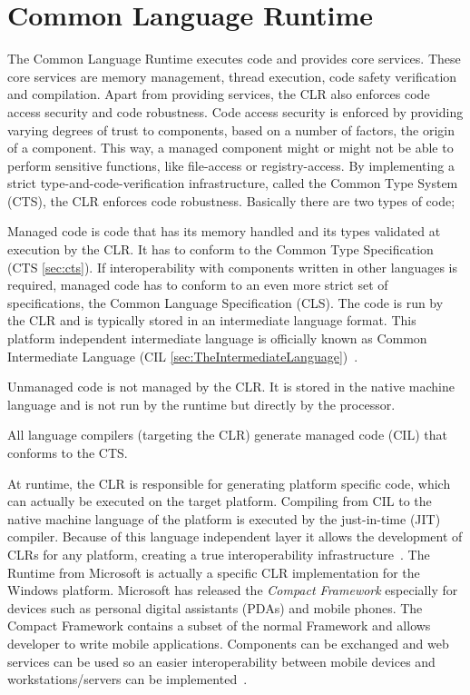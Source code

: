 \section{Common Language Runtime}
\label{sec:clr}
The Common Language Runtime executes code and provides core services. These core services are memory management, thread execution, code safety verification and compilation. Apart from providing services, the CLR also enforces code access security and code robustness. 
Code access security is enforced by providing varying degrees of trust to components, based on a number of factors, \eg the origin of a component. 
This way, a managed component might or might not be able to perform sensitive functions, like file-access or registry-access. 
By implementing a strict type-and-code-verification infrastructure, called the Common Type System (CTS), the CLR enforces code robustness. Basically there are two types of code; 

\begin{description}[noitemsep,style=nextline]
\item[Managed]
Managed code is code that has its memory handled and its types validated at execution by the CLR.
It has to conform to the Common Type Specification (CTS \autoref{sec:cts}).
If interoperability with components written in other languages is required, managed code has to conform to an even more strict set of specifications, the Common Language Specification (CLS).
The code is run by the CLR and is typically stored in an intermediate language format. This platform independent intermediate language is officially known as Common Intermediate Language (CIL \autoref{sec:TheIntermediateLanguage})~\cite{Watkins00}.
\item[Unmanaged]
Unmanaged code is not managed by the CLR. It is stored in the native machine language and is not run by the runtime but directly by the processor.
\end{description}

All language compilers (targeting the CLR) generate managed code (CIL) that conforms to the CTS. 

At runtime, the CLR is responsible for generating platform specific code, which can actually be executed on the target platform.
Compiling from CIL to the native machine language of the platform is executed by the just-in-time (JIT) compiler. Because of this language independent layer it allows the development of CLRs for any platform, creating a true interoperability infrastructure~\cite{Watkins00}.
The \dotNET Runtime from Microsoft is actually a specific CLR implementation for the Windows platform.
Microsoft has released the \emph{\dotNET Compact Framework} especially for devices such as personal digital assistants (PDAs) and mobile phones.
The \dotNET Compact Framework contains a subset of the normal \dotNET Framework and allows \dotNET developer to write mobile applications. Components can be exchanged and web services can be used so an easier interoperability between mobile devices and workstations/servers can be implemented~\cite{Microsoft03-3}.

